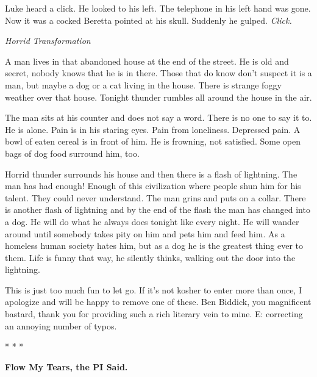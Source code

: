 Luke heard a click. He looked to his left. The telephone in his
left hand was gone. Now it was a cocked Beretta pointed at his
skull. Suddenly he gulped. {\em Click.} 

 





{\em Horrid Transformation}



A man lives in that abandoned house at the end of the street. He is
old and secret, nobody knows that he is in there. Those that do
know don't suspect it is a man, but maybe a dog or a cat living in
the house. There is strange foggy weather over that house. Tonight
thunder rumbles all around the house in the air.



The man sits at his counter and does not say a word. There is no
one to say it to. He is alone. Pain is in his staring eyes. Pain
from loneliness. Depressed pain. A bowl of eaten cereal is in front
of him. He is frowning, not satisfied. Some open bags of dog food
surround him, too.



Horrid thunder surrounds his house and then there is a flash of
lightning. The man has had enough! Enough of this civilization
where people shun him for his talent. They could never understand.
The man grins and puts on a collar. There is another flash of
lightning and by the end of the flash the man has changed into a
dog. He will do what he always does tonight like every night. He
will wander around until somebody takes pity on him and pets him
and feed him. As a homeless human society hates him, but as a dog
he is the greatest thing ever to them. Life is funny that way, he
silently thinks, walking out the door into the lightning. 

 





This is just too much fun to let go. If it's not kosher to enter
more than once, I apologize and will be happy to remove one of
these. Ben Biddick, you magnificent bastard, thank you for
providing such a rich literary vein to mine. E: correcting an
annoying number of typos.

* * *



{\bf Flow My Tears, the PI Said.}



